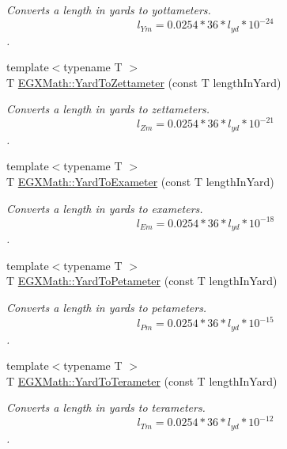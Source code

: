 \begin{DoxyCompactItemize}
\begin{DoxyCompactList}\small\item\em Converts a length in yards to yottameters. \[ l_{Ym}=0.0254 * 36 * l_{yd} * 10^{-24} \]. \end{DoxyCompactList}\item 
{\footnotesize template$<$typename T $>$ }\\T \mbox{\hyperlink{group___e_g_x_math-_conversions-_length_conversions-_imperial-_yard-_s_i_gace544729d64e05b9b27c098c659f10d1}{E\+G\+X\+Math\+::\+Yard\+To\+Zettameter}} (const T length\+In\+Yard)
\begin{DoxyCompactList}\small\item\em Converts a length in yards to zettameters. \[ l_{Zm}=0.0254 * 36 * l_{yd} * 10^{-21} \]. \end{DoxyCompactList}\item 
{\footnotesize template$<$typename T $>$ }\\T \mbox{\hyperlink{group___e_g_x_math-_conversions-_length_conversions-_imperial-_yard-_s_i_ga4a7094ebfbac7caa8c6b4eb0f695e57a}{E\+G\+X\+Math\+::\+Yard\+To\+Exameter}} (const T length\+In\+Yard)
\begin{DoxyCompactList}\small\item\em Converts a length in yards to exameters. \[ l_{Em}=0.0254 * 36 * l_{yd} * 10^{-18} \]. \end{DoxyCompactList}\item 
{\footnotesize template$<$typename T $>$ }\\T \mbox{\hyperlink{group___e_g_x_math-_conversions-_length_conversions-_imperial-_yard-_s_i_gac5e73459c6a98c1aa2e613e03f7b2e57}{E\+G\+X\+Math\+::\+Yard\+To\+Petameter}} (const T length\+In\+Yard)
\begin{DoxyCompactList}\small\item\em Converts a length in yards to petameters. \[ l_{Pm}=0.0254 * 36 * l_{yd} * 10^{-15} \]. \end{DoxyCompactList}\item 
{\footnotesize template$<$typename T $>$ }\\T \mbox{\hyperlink{group___e_g_x_math-_conversions-_length_conversions-_imperial-_yard-_s_i_ga67c4bd89e074c1615f4f67d6877e93d0}{E\+G\+X\+Math\+::\+Yard\+To\+Terameter}} (const T length\+In\+Yard)
\begin{DoxyCompactList}\small\item\em Converts a length in yards to terameters. \[ l_{Tm}=0.0254 * 36 * l_{yd} * 10^{-12} \]. \end{DoxyCompactList}\item 

\end{DoxyCompactItemize}
